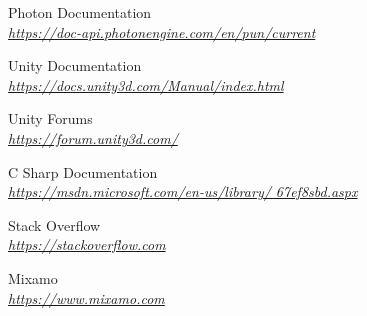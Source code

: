 \begin{thebibliography}{9}
Photon Documentation\\
\textit{\url{https://doc-api.photonengine.com/en/pun/current}}

Unity Documentation\\
\textit{\url{https://docs.unity3d.com/Manual/index.html}}

Unity Forums\\
\textit{\url{https://forum.unity3d.com/}}

C Sharp Documentation\\
\textit{\url{https://msdn.microsoft.com/en-us/library/
67ef8sbd.aspx}}

Stack Overflow\\
\textit{\url{https://stackoverflow.com}}

Mixamo\\
\textit{\url{https://www.mixamo.com}}
\end{thebibliography}